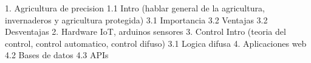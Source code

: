 








1. Agricultura de precision
    1.1 Intro (hablar general de la agricultura, invernaderos y agricultura protegida)
    3.1 Importancia
    3.2 Ventajas
    3.2 Desventajas %
2. Hardware 
    IoT, arduinos sensores
3. Control
    Intro (teoria del control, control automatico, control difuso)
    3.1 Logica difusa
4. Aplicaciones web
    4.2 Bases de datos
    4.3 APIs


